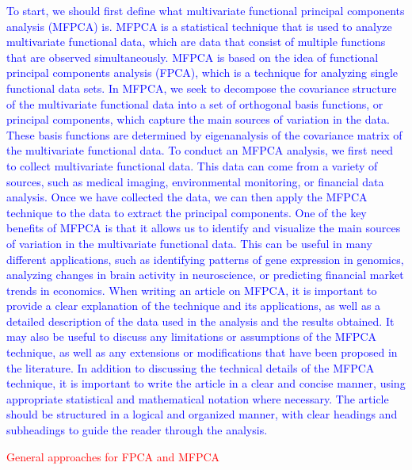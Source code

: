 \textcolor{blue}{To start, we should first define what multivariate functional principal components analysis (MFPCA) is. MFPCA is a statistical technique that is used to analyze multivariate functional data, which are data that consist of multiple functions that are observed simultaneously. MFPCA is based on the idea of functional principal components analysis (FPCA), which is a technique for analyzing single functional data sets.
In MFPCA, we seek to decompose the covariance structure of the multivariate functional data into a set of orthogonal basis functions, or principal components, which capture the main sources of variation in the data. These basis functions are determined by eigenanalysis of the covariance matrix of the multivariate functional data.
To conduct an MFPCA analysis, we first need to collect multivariate functional data. This data can come from a variety of sources, such as medical imaging, environmental monitoring, or financial data analysis. Once we have collected the data, we can then apply the MFPCA technique to the data to extract the principal components.
One of the key benefits of MFPCA is that it allows us to identify and visualize the main sources of variation in the multivariate functional data. This can be useful in many different applications, such as identifying patterns of gene expression in genomics, analyzing changes in brain activity in neuroscience, or predicting financial market trends in economics.
When writing an article on MFPCA, it is important to provide a clear explanation of the technique and its applications, as well as a detailed description of the data used in the analysis and the results obtained. It may also be useful to discuss any limitations or assumptions of the MFPCA technique, as well as any extensions or modifications that have been proposed in the literature.
In addition to discussing the technical details of the MFPCA technique, it is important to write the article in a clear and concise manner, using appropriate statistical and mathematical notation where necessary. The article should be structured in a logical and organized manner, with clear headings and subheadings to guide the reader through the analysis.}

\textcolor{red}{General approaches for FPCA and MFPCA}

